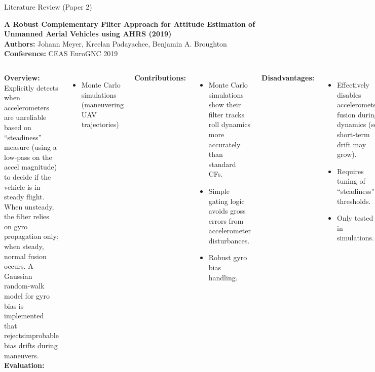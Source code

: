\documentclass[aspectratio=169,xcolor=dvipsnames]{beamer}
\begin{document}
\begin{frame}{Literature Review (Paper 2)}

\textbf{A Robust Complementary Filter Approach for Attitude Estimation of Unmanned Aerial Vehicles using AHRS (2019) \hfill \textcolor{blue}{\cite{CEAS-GNC-2019-036}}}\\
\textbf{Authors: }Johann Meyer, Kreelan Padayachee, Benjamin A. Broughton \\
\textbf{Conference: }CEAS EuroGNC 2019

\vspace{1em}
\scriptsize
\begin{columns}
    \textbf{Overview:}\\
     Explicitly detects when accelerometers are unreliable based on “steadiness” measure (using a low‑pass on the accel magnitude) to decide if the vehicle is in steady flight. When unsteady, the filter relies on gyro propagation only; when steady, normal fusion occurs. A Gaussian random-walk model for gyro bias is implemented that rejectsimprobable bias drifts during maneuvers. 
    \vspace{0.5em}
    \textbf{Evaluation:}
    \begin{itemize}
        \item Monte Carlo simulations (maneuvering UAV trajectories)
    \end{itemize}

    \textbf{Contributions:}
    \begin{itemize}
        \item Monte Carlo simulations show their filter tracks roll dynamics more accurately than standard CFs\textcolor{blue}{\cite{compfilter}}. 
        \item Simple gating logic avoids gross errors from accelerometer disturbances. 
        \item Robust gyro bias handling.
    \end{itemize}

    \vspace{0.5em}
    \textbf{Disadvantages:}
    \begin{itemize}
        \item Effectively disables accelerometer fusion during dynamics (so short-term drift may grow). 
        \item Requires tuning of “steadiness” thresholds. 
        \item Only tested in simulations.
    \end{itemize}
\end{columns}

\end{frame}
\end{document}
